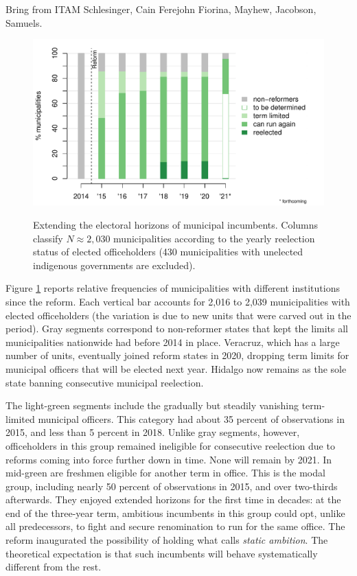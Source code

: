 \documentclass[letter,12pt]{article}
\begin{document}
Bring from ITAM Schlesinger, Cain Ferejohn Fiorina, Mayhew, Jacobson, Samuels. 

\begin{figure}
  \centering
  \includegraphics[width=.85\columnwidth]{../plots/horizon-yrs.pdf} \\
  \caption{Extending the electoral horizons of municipal incumbents. Columns classify $N \approx 2,030$ municipalities according to the yearly reelection status of elected officeholders (430 municipalities with unelected indigenous governments are excluded).}\label{F:horizons}
\end{figure}

Figure \ref{F:horizons} reports relative frequencies of municipalities with different institutions since the reform. Each vertical bar accounts for 2,016 to 2,039 municipalities with elected officeholders (the variation is due to new units that were carved out in the period). Gray segments correspond to non-reformer states that kept the limits all municipalities nationwide had before 2014 in place. Veracruz, which has a large number of units, eventually joined reform states in 2020, dropping term limits for municipal officers that will be elected next year. Hidalgo now remains as the sole state banning consecutive municipal reelection. 

The light-green segments include the gradually but steadily vanishing term-limited municipal officers. This category had about 35 percent of observations in 2015, and less than 5 percent in 2018. Unlike gray segments, however, officeholders in this group remained ineligible for consecutive reelection due to reforms coming into force further down in time. None will remain by 2021. In mid-green are freshmen eligible for another term in office. This is the modal group, including nearly 50 percent of observations in 2015, and over two-thirds afterwards. They enjoyed extended horizons for the first time in decades: at the end of the three-year term, ambitious incumbents in this group could opt, unlike all predecessors, to fight and secure renomination to run for the same office. The reform inaugurated the possibility of holding what \citet{schlesinger.1966} calls \emph{static ambition}. The theoretical expectation is that such incumbents will behave systematically different from the rest. 
\end{document}
